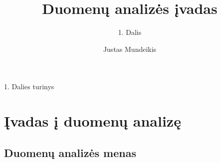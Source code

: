 \documentclass[11pt,xcolor=table]{beamer}
\author{Justas Mundeikis}
\title{Duomenų analizės įvadas}
\subtitle{1. Dalis}
\begin{document}

\begin{frame}
\titlepage
\end{frame}


\begin{frame}{1. Dalies turinys}
\tableofcontents
\end{frame}

\section{Įvadas į duomenų analizę}
\subsection{Duomenų analizės menas}
\end{document}
